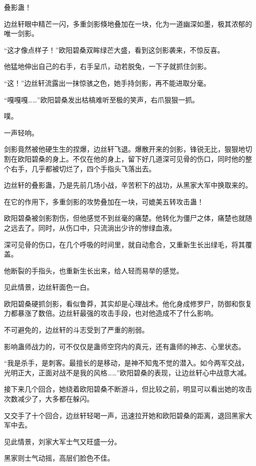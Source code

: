 \begin{this_body}
叠影蛊！

边丝轩眼中精芒一闪，多重剑影倏地叠加在一块，化为一道幽深如墨，极其浓郁的唯一剑影。

“这才像点样子！”欧阳碧桑双眸绿芒大盛，看到这剑影袭来，不惊反喜。

他猛地伸出自己的右手，右手呈爪，动若脱兔，一下子就抓住剑影。

“这！”边丝轩流露出一抹惊骇之色，她手持剑影，再不能进取分毫。

“嘎嘎嘎……”欧阳碧桑发出枯槁难听至极的笑声，右爪狠狠一抓。

噗。

一声轻响。

剑影竟然被他硬生生的捏爆，边丝轩飞退。爆散开来的剑影，锋锐无比，狠狠地切割在欧阳碧桑的身上。不仅在他的身上，留下好几道深可见骨的伤口，同时他的整个右手，几乎都被切烂了，四个手指头飞落出去。

边丝轩的叠影蛊，乃是先前几场小战，辛苦积下的战功，从黑家大军中换取来的。

在它的作用下，多重剑影的攻势叠加在一块，可媲美五转攻击蛊！

欧阳碧桑被剑影割伤，但他感觉不到丝毫的痛楚。他转化为僵尸之体，痛楚也就随之远去了。同时，从伤口中，只流淌出少许的惨绿血液。

深可见骨的伤口，在几个呼吸的时间里，就自动愈合，又重新生长出绿毛，将其覆盖。

他断裂的手指头，也重新生长出来，给人轻而易举的感觉。

见此情景，边丝轩面色一白。

欧阳碧桑硬抓剑影，看似鲁莽，其实却是心理战术。他化身成修罗尸，防御和恢复力都暴涨了数倍。边丝轩最强的攻击手段，也对他造成不了什么影响。

不可避免的，边丝轩的斗志受到了严重的削弱。

影响蛊师战力的，可不仅仅是蛊师空窍内的真元，还有蛊师的神志、心里状态。

“我是杀手，是刺客。最擅长的是移动，是神不知鬼不觉的潜入。如今两军交战，光明正大，正面对战不是我的风格……”欧阳碧桑的表现，让边丝轩心中战意大减。

接下来几个回合，她绕着欧阳碧桑不断游斗，但比较之前，明显可以看出她的攻击次数减少了，大多都在躲闪。

又交手了十个回合，边丝轩轻喝一声，迅速拉开她和欧阳碧桑的距离，退回黑家大军中去。

见此情景，刘家大军士气又旺盛一分。

黑家则士气动摇，高层们脸色不佳。


\end{this_body}
